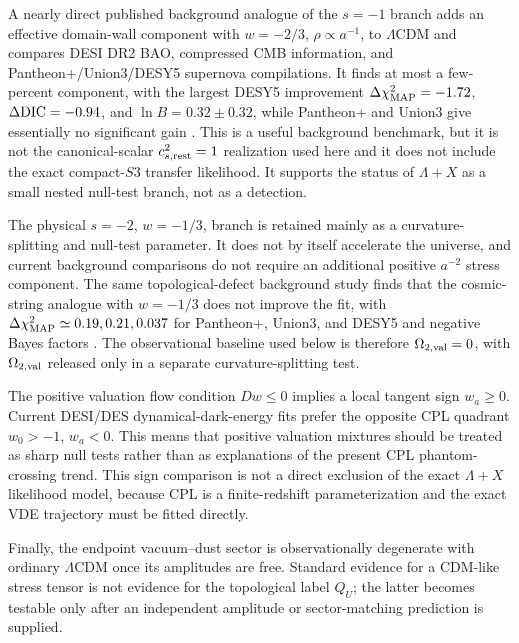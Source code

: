 \documentclass[11pt,a4paper]{article}
\def\Sthree{S3}%
\def\Dil{D}%
\def\QU{Q_U}%
\numberwithin{equation}{section}
\theoremstyle{definition}
\theoremstyle{plain}
\theoremstyle{remark}
\newcommand{\Sthree}{S^3}
\newcommand{\Dil}{\mathscr{D}}
\newcommand{\QU}{Q_U}
\begin{document}
A nearly direct published background analogue of the \(s=-1\) branch adds an effective domain-wall component with \(w=-2/3\), \(\rho\propto a^{-1}\), to \(\Lambda\)CDM and compares DESI DR2 BAO, compressed CMB information, and Pantheon+/Union3/DESY5 supernova compilations. It finds at most a few-percent component, with the largest DESY5 improvement \(\Delta\chi^2_{\rm MAP}=-1.72\), \(\Delta {\rm DIC}=-0.94\), and \(\ln B=0.32\pm0.32\), while Pantheon+ and Union3 give essentially no significant gain \cite{AnHanZhang2025}. This is a useful background benchmark, but it is not the canonical-scalar \(c_{s,\rm rest}^2=1\) realization used here and it does not include the exact compact-\(\Sthree\) transfer likelihood. It supports the status of \(\Lambda+X\) as a small nested null-test branch, not as a detection.

The physical \(s=-2\), \(w=-1/3\), branch is retained mainly as a curvature-splitting and null-test parameter. It does not by itself accelerate the universe, and current background comparisons do not require an additional positive \(a^{-2}\) stress component. The same topological-defect background study finds that the cosmic-string analogue with \(w=-1/3\) does not improve the fit, with \(\Delta\chi^2_{\rm MAP}\simeq0.19,0.21,0.037\) for Pantheon+, Union3, and DESY5 and negative Bayes factors \cite{AnHanZhang2025}. The observational baseline used below is therefore \(\Omega_{2,\rm val}=0\), with \(\Omega_{2,\rm val}\) released only in a separate curvature-splitting test.

The positive valuation flow condition \(\Dil w\le0\) implies a local tangent sign \(w_a\ge0\). Current DESI/DES dynamical-dark-energy fits prefer the opposite CPL quadrant \(w_0>-1\), \(w_a<0\). This means that positive valuation mixtures should be treated as sharp null tests rather than as explanations of the present CPL phantom-crossing trend. This sign comparison is not a direct exclusion of the exact \(\Lambda+X\) likelihood model, because CPL is a finite-redshift parameterization and the exact VDE trajectory must be fitted directly.

Finally, the endpoint vacuum--dust sector is observationally degenerate with ordinary \(\Lambda\)CDM once its amplitudes are free. Standard evidence for a CDM-like stress tensor is not evidence for the topological label \(\QU\); the latter becomes testable only after an independent amplitude or sector-matching prediction is supplied.
\end{document}
